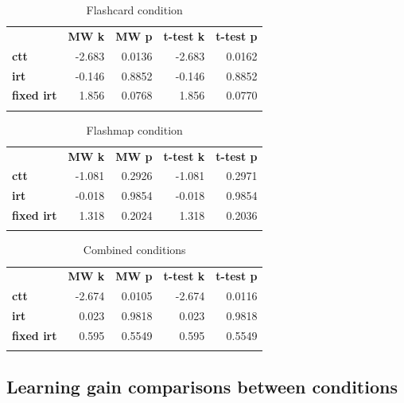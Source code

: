 \begin{longtable}[c]{@{}lrrrr@{}}
\caption{Flashcard condition}
\endfirsthead
\endhead
\toprule\addlinespace
& \textbf{MW k} & \textbf{MW p} &
\textbf{t-test k} & \textbf{t-test p}
\\\addlinespace
\midrule
\textbf{ctt} & -2.683 & 0.0136 & -2.683 & 0.0162
\\\addlinespace
\textbf{irt} & -0.146 & 0.8852 & -0.146 & 0.8852
\\\addlinespace
\textbf{fixed irt} & 1.856 & 0.0768 & 1.856 & 0.0770
\\\addlinespace
\bottomrule
    \label{tab:comp_pp_fc_comp}
\end{longtable}

\begin{longtable}[c]{@{}lrrrr@{}}
\caption{Flashmap condition}
\endfirsthead
\endhead
\toprule\addlinespace
& \textbf{MW k} & \textbf{MW p} &
\textbf{t-test k} & \textbf{t-test p}
\\\addlinespace
\midrule
\textbf{ctt} & -1.081 & 0.2926 & -1.081 & 0.2971
\\\addlinespace
\textbf{irt} & -0.018 & 0.9854 & -0.018 & 0.9854
\\\addlinespace
\textbf{fixed irt} & 1.318 & 0.2024 & 1.318 & 0.2036
\\\addlinespace
\bottomrule
    \label{tab:comp_pp_fm_comp}
\end{longtable}

\begin{longtable}[c]{@{}lrrrr@{}}
\caption{Combined conditions}
\endfirsthead
\endhead
\toprule\addlinespace
& \textbf{MW k} & \textbf{MW p} &
\textbf{t-test k} & \textbf{t-test p}
\\\addlinespace
\midrule
\textbf{ctt} & -2.674 & 0.0105 & -2.674 & 0.0116
\\\addlinespace
\textbf{irt} & 0.023 & 0.9818 & 0.023 & 0.9818
\\\addlinespace
\textbf{fixed irt} & 0.595 & 0.5549 & 0.595 & 0.5549
\\\addlinespace
\bottomrule
    \label{tab:comp_pp_gen_comp}
\end{longtable}

\FloatBarrier
\subsection{Learning gain comparisons between conditions}

